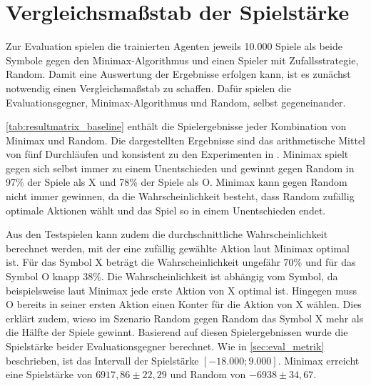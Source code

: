 \section{Vergleichsmaßstab der Spielstärke}
\label{sec:vergleichswerte}
Zur Evaluation spielen die trainierten Agenten jeweils 10.000 Spiele als beide Symbole gegen den Minimax-Algorithmus und einen Spieler mit Zufallsstrategie, Random. 
Damit eine Auswertung der Ergebnisse erfolgen kann, ist es zunächst notwendig einen Vergleichsmaßstab zu schaffen. 
Dafür spielen die Evaluationsgegner, Minimax-Algorithmus und Random, selbst gegeneinander.

\cref{tab:resultmatrix_baseline} enthält die Spielergebnisse jeder Kombination von Minimax und Random.
Die dargestellten Ergebnisse sind das arithmetische Mittel von fünf Durchläufen und konsistent zu den Experimenten in \cite{mirnovi.QLearningTicTacToe2020}.
Minimax spielt gegen sich selbst immer zu einem Unentschieden und gewinnt gegen Random in 97\% der Spiele als X und 78\% der Spiele als O.
Minimax kann gegen Random nicht immer gewinnen, da die Wahrscheinlichkeit besteht, dass Random zufällig optimale Aktionen wählt und das Spiel so in einem Unentschieden endet.

Aus den Testspielen kann zudem die durchschnittliche Wahrscheinlichkeit berechnet werden, mit der eine zufällig gewählte Aktion laut Minimax optimal ist. 
Für das Symbol X beträgt die Wahrscheinlichkeit ungefähr 70\% und für das Symbol O knapp 38\%. 
Die Wahrscheinlichkeit ist abhängig vom Symbol, da beispielsweise laut Minimax jede erste Aktion von X optimal ist. Hingegen muss O bereits in seiner ersten Aktion einen Konter für die Aktion von X wählen. Dies erklärt zudem, wieso im Szenario Random gegen Random das Symbol X mehr als die Hälfte der Spiele gewinnt. Basierend auf diesen Spielergebnissen wurde die Spielstärke beider Evaluationsgegner berechnet. 
Wie in \cref{sec:eval_metrik} beschrieben, ist das Intervall der Spielstärke $[-18.000;9.000]$. 
Minimax erreicht eine Spielstärke von $6917,86 \pm 22,29$ und Random von $-6938 \pm34,67$.


